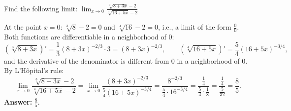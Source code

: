 
\begin{question}
Find the following limit:
$\displaystyle \lim_{x\to 0}\frac{\sqrt[3]{8+3x}-2}{\sqrt[4]{16+5x}-2}$
\end{question}

\begin{solution}
At the point $x=0$: $\sqrt[3]{8}-2=0$ and $\sqrt[4]{16}-2=0$, i.e., a limit of the form $\frac00$. Both functions are differentiable in a neighborhood of $0$:
\[
\left(\sqrt[3]{8+3x}\right)'=\frac13(8+3x)^{-2/3}\cdot3=(8+3x)^{-2/3},\qquad
\left(\sqrt[4]{16+5x}\right)'=\frac54(16+5x)^{-3/4},
\]
and the derivative of the denominator is different from $0$ in a neighborhood of $0$. By L'Hôpital's rule:
\[
\lim_{x\to0}\frac{\sqrt[3]{8+3x}-2}{\sqrt[4]{16+5x}-2}
=\lim_{x\to0}\frac{(8+3x)^{-2/3}}{\frac54(16+5x)^{-3/4}}
=\frac{8^{-2/3}}{\frac54\cdot16^{-3/4}}=\frac{\frac14}{\frac54\cdot\frac18}=\frac{\frac14}{\frac{5}{32}}=\frac85.
\]
\textbf{Answer:} $\frac85$.
\end{solution}
